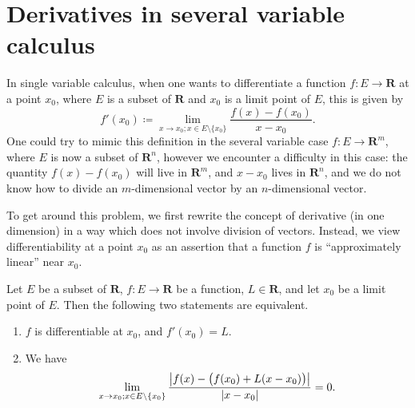 \section{Derivatives in several variable calculus}\label{sec 6.2}

\begin{note}
    In single variable calculus, when one wants to differentiate a function \(f : E \to \mathbf{R}\) at a point \(x_0\), where \(E\) is a subset of \(\mathbf{R}\) and \(x_0\) is a limit point of \(E\), this is given by
    \[
        f'(x_0) \coloneqq \lim_{x \to x_0 ; x \in E \setminus \{x_0\}} \frac{f(x) - f(x_0)}{x - x_0}.
    \]
    One could try to mimic this definition in the several variable case \(f : E \to \mathbf{R}^m\), where \(E\) is now a subset of \(\mathbf{R}^n\), however we encounter a difficulty in this case:
    the quantity \(f(x) - f(x_0)\) will live in \(\mathbf{R}^m\), and \(x - x_0\) lives in \(\mathbf{R}^n\), and we do not know how to divide an \(m\)-dimensional vector by an \(n\)-dimensional vector.

    To get around this problem, we first rewrite the concept of derivative (in one dimension) in a way which does not involve division of vectors.
    Instead, we view differentiability at a point \(x_0\) as an assertion that a function \(f\) is ``approximately linear'' near \(x_0\).
\end{note}

\begin{lemma}\label{6.2.1}
    Let \(E\) be a subset of \(\mathbf{R}\), \(f : E \to \mathbf{R}\) be a function, \(L \in \mathbf{R}\), and let \(x_0\) be a limit point of \(E\).
    Then the following two statements are equivalent.
    \begin{enumerate}
        \item \(f\) is differentiable at \(x_0\), and \(f'(x_0) = L\).
        \item We have
              \[
                  \lim_{x \to x_0 ; x \in E \setminus \{x_0\}} \frac{\abs*{f(x) - \big(f(x_0) + L (x - x_0)\big)}}{\abs*{x - x_0}} = 0.
              \]
    \end{enumerate}
\end{lemma}

